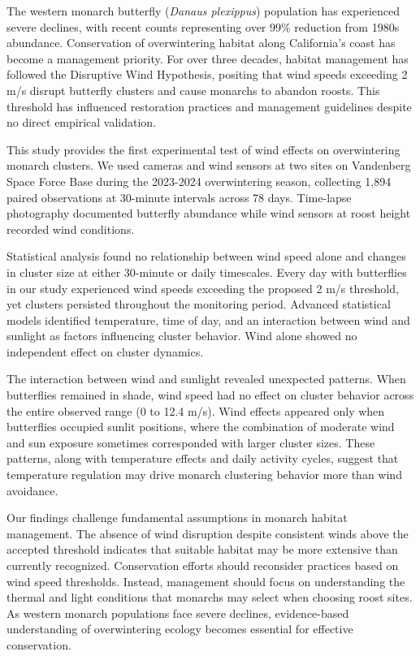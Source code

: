 The western monarch butterfly (\textit{Danaus plexippus}) population has experienced severe declines, with recent counts representing over 99\% reduction from 1980s abundance. Conservation of overwintering habitat along California's coast has become a management priority. For over three decades, habitat management has followed the Disruptive Wind Hypothesis, positing that wind speeds exceeding 2 m/s disrupt butterfly clusters and cause monarchs to abandon roosts. This threshold has influenced restoration practices and management guidelines despite no direct empirical validation.

This study provides the first experimental test of wind effects on overwintering monarch clusters. We used cameras and wind sensors at two sites on Vandenberg Space Force Base during the 2023-2024 overwintering season, collecting 1,894 paired observations at 30-minute intervals across 78 days. Time-lapse photography documented butterfly abundance while wind sensors at roost height recorded wind conditions.

Statistical analysis found no relationship between wind speed alone and changes in cluster size at either 30-minute or daily timescales. Every day with butterflies in our study experienced wind speeds exceeding the proposed 2 m/s threshold, yet clusters persisted throughout the monitoring period. Advanced statistical models identified temperature, time of day, and an interaction between wind and sunlight as factors influencing cluster behavior. Wind alone showed no independent effect on cluster dynamics.

The interaction between wind and sunlight revealed unexpected patterns. When butterflies remained in shade, wind speed had no effect on cluster behavior across the entire observed range (0 to 12.4 m/s). Wind effects appeared only when butterflies occupied sunlit positions, where the combination of moderate wind and sun exposure sometimes corresponded with larger cluster sizes. These patterns, along with temperature effects and daily activity cycles, suggest that temperature regulation may drive monarch clustering behavior more than wind avoidance.

Our findings challenge fundamental assumptions in monarch habitat management. The absence of wind disruption despite consistent winds above the accepted threshold indicates that suitable habitat may be more extensive than currently recognized. Conservation efforts should reconsider practices based on wind speed thresholds. Instead, management should focus on understanding the thermal and light conditions that monarchs may select when choosing roost sites. As western monarch populations face severe declines, evidence-based understanding of overwintering ecology becomes essential for effective conservation.